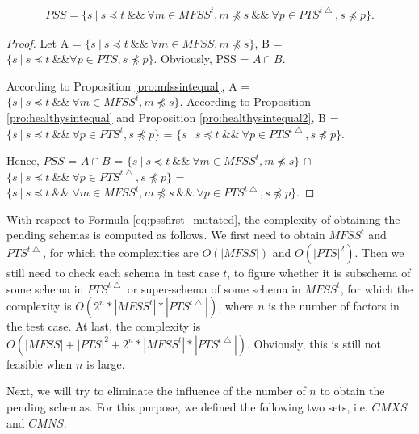 \begin{equation}
\begin{aligned}\label{eq:pssfirst_mutated}
PSS=\{ s\ |\ s \preceq t\ \&\&\ \forall m \in MFSS^{t},  m \npreceq s  \ \&\&\  \forall p \in PTS^{t\bigtriangleup}, s \npreceq p \} .
\end{aligned}
\end{equation}

\begin{proof}

Let A = $\{ s\ |\  s \preceq t\ \&\&\ \forall m \in MFSS,  m \npreceq s \}$, B = $ \{ s\ |\ s \preceq t\ \&\&  \forall p \in PTS, s \npreceq p \} $. Obviously, PSS = $A \cap B$.

According to Proposition \ref{pro:mfssintequal}, A = $\{ s\ |\  s \preceq t\ \&\&\ \forall m \in MFSS^{t},  m \npreceq s \}$.
According to Proposition \ref{pro:healthysintequal} and Proposition \ref{pro:healthysintequal2}, B = $\{ s\ |\  s \preceq t\ \&\&\ \forall p \in PTS^{t},  s \npreceq p \}$ = $\{ s\ |\  s \preceq t\ \&\&\ \forall p \in PTS^{t\bigtriangleup},  s \npreceq p \}$.

Hence, $PSS$ = $A \cap B$ = $\{ s\ |\  s \preceq t\ \&\&\ \forall m \in MFSS^{t},  m \npreceq s \}$ $\cap$ $\{ s\ |\  s \preceq t\ \&\&\ \forall p \in PTS^{t\bigtriangleup},  s \npreceq p \}$ = $\{ s\ |\ s \preceq t\ \&\&\ \forall m \in MFSS^{t},  m \npreceq s  \ \&\&\  \forall p \in PTS^{t\bigtriangleup}, s \npreceq p \}$.
\end{proof}


With respect to Formula \ref{eq:pssfirst_mutated}, the complexity of obtaining the pending schemas is computed as follows. We first need to obtain $MFSS^{t}$ and $PTS^{t\bigtriangleup}$, for which the complexities are $O(|MFSS|)$ and $O(|PTS|^{2})$. Then we still need to check each schema in test case $t$, to figure whether it is subschema of some schema in $PTS^{t\bigtriangleup}$ or super-schema of some schema in $MFSS^{t}$, for which the complexity is $O(2^{n}* |MFSS^{t}| * |PTS^{t\bigtriangleup}|)$, where $n$ is the number of factors in the test case.  At last, the complexity is $O(|MFSS| + |PTS|^{2} + 2^{n}* |MFSS^{t}| * |PTS^{t\bigtriangleup}| )$. Obviously, this is still not feasible when $n$ is large.



Next, we will try to eliminate the influence of the number of $n$ to obtain the pending schemas. For this purpose, we defined the following two sets, i.e. $CMXS$ and $CMNS$.

